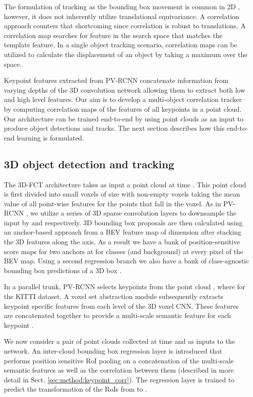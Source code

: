 \documentclass[10pt,twocolumn,letterpaper]{article}
\begin{document}
The formulation of tracking as the bounding box movement is common in 2D \cite{Held2016}, however, it does not inherently utilize translational equivariance. A correlation approach counters that shortcoming since correlation is robust to translations. A correlation map searches for feature in the search space that matches the template feature. In a single object tracking scenario, correlation maps can be utilized to calculate the displacement of an object by taking a maximum over the space.

Keypoint features extracted from PV-RCNN concatenate information from varying depths of the 3D convolution network allowing them to extract both low and high level features. Our aim is to develop a multi-object correlation tracker by computing correlation maps of the features of all keypoints in a point cloud. Our architecture can be trained end-to-end by using point clouds as an input to produce object detections and tracks. The next section describes how this end-to-end learning is formulated.

\subsection{3D object detection and tracking}\label{sec:method:DnT}
The 3D-FCT architecture takes as input a point cloud  at time . This point cloud is first divided into small voxels of size  with non-empty voxels taking the mean value of all point-wise features for the points that fall in the voxel. As in PV-RCNN \cite{Shi_2020_CVPR}, we utilize a series of  3D sparse convolution layers to downsample the input by  and  respectively. 3D bounding box proposals are then calculated using an anchor-based approach from a BEV feature map of dimension  after stacking the 3D features along the  axis. As a result we have a bank of  position-sensitive score maps for two anchors at  for  classes (and background) at every pixel of the BEV map. Using a second regression branch we also have a bank of  class-agnostic bounding box predictions of a 3D box .

In a parallel trunk, PV-RCNN \cite{Shi_2020_CVPR} selects  keypoints  from the point cloud  , where  for the KITTI dataset. A voxel set abstraction module subsequently extracts keypoint specific features from each level of the 3D voxel CNN. These features are concatenated together to provide a multi-scale semantic feature  for each keypoint .

We now consider a pair of point clouds  collected at time  and  as inputs to the network. An inter-cloud bounding box regression layer is introduced that performs position sensitive RoI pooling on a concatenation of the multi-scale semantic features  as well as the correlation between them (described in more detail in Sect. \ref{sec:method:keypoint_corr}). The regression layer is trained to predict the transformation  of the RoIs from  to .
\end{document}
